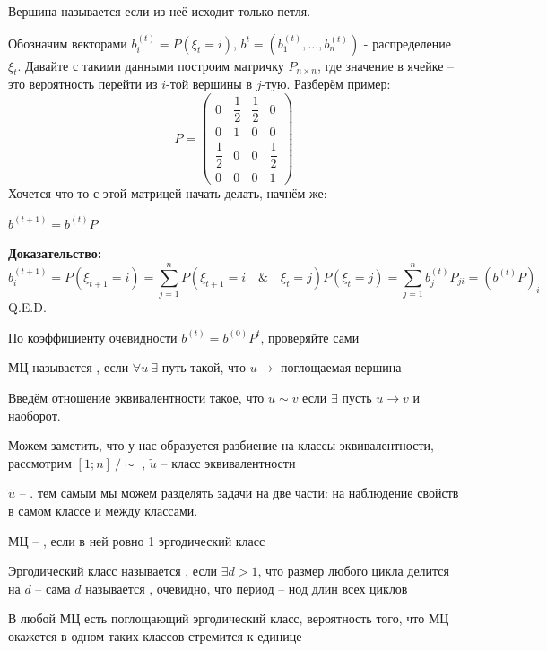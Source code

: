 Вершина называется  если из неё исходит только петля.




Обозначим векторами $b^{(t)}_i = P(\xi_t = i)$, $b^{t} = (b_1^{(t)}, \ldots, b_n^{(t)})$ - распределение $\xi_t$. 
\newline
Давайте с такими данными построим матричку $P_{n\times n}$, где значение в ячейке -- это вероятность перейти из $i$-той вершины в $j$-тую. Разберём пример:
\newline 
\[
P = 
\begin{pmatrix}
0 & \dfrac{1}{2} & \dfrac{1}{2} & 0 \\
0 & 1 & 0 & 0 \\
\dfrac{1}{2} & 0 & 0 & \dfrac{1}{2} \\
0 & 0 & 0 & 1
\end{pmatrix}
\]
Хочется что-то с этой матрицей начать делать, начнём же:


 $b^{(t + 1)} = b^{(t)}P$

     \textbf{Доказательство:}
      $$ b_i^{(t + 1)} = P(\xi_{t+1} = i) = \sum_{j = 1}^n P(\xi_{t+1} = i \quad\&\quad \xi_t = j)P(\xi_t = j) = \sum_{j = 1}^{n}b_{j}^{(t)}P_{ji} = (b^{(t)}P)_i$$
\hfill Q.E.D.

По коэффициенту очевидности $b^{(t)} = b^{(0)}P^t$,  проверяйте сами

МЦ называется , если $\forall u \ \exists$ путь такой, что $u \rightarrow$ поглощаемая вершина

Введём отношение эквивалентности такое, что $u \sim v $ если $\exists$ пусть $u \rightarrow v$ и наоборот.

Можем заметить, что у нас образуется разбиение на классы эквивалентности, рассмотрим $[1 ;n]\ /\sim$ ,  
$\tilde{u}$ -- класс эквивалентности 




$\tilde{u}$ -- .
тем самым мы можем разделять задачи на две части: на наблюдение свойств в самом классе и между классами.


МЦ -- , если в ней ровно 1 эргодический класс

Эргодический класс называется , если $\exists d > 1$, что размер любого цикла делится на $d$ -- сама $d$ называется , очевидно, что период -- нод длин всех циклов


     В любой МЦ есть поглощающий эргодический класс, вероятность того, что МЦ окажется в одном таких классов стремится к единице

